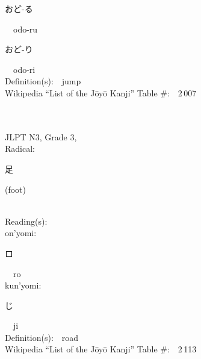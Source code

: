 \begin{multicols}{2}
{\hspace*{2em}}{\begin{CJK}{UTF8}{min} おど-る \end{CJK}}\ \ odo-ru\ \ \\
{\hspace*{2em}}{\begin{CJK}{UTF8}{min} おど-り \end{CJK}}\ \ odo-ri\ \ \\
Definition(s):\ \ jump \\
Wikipedia ``List of the J\=oy\=o Kanji'' Table \#:\ \ 2\,007 \\
\ \ \\
{\fontsize{34pt}{40pt}  }\ \ \\  %
{JLPT N3, Grade 3, \\Radical:\ \ {\begin{CJK}{UTF8}{min} 足 \end{CJK}} (foot) } \\
Reading(s):\ \ \\
{\hspace*{1em}}on'yomi:\ \ \\
{\hspace*{2em}}{\begin{CJK}{UTF8}{min} ロ \end{CJK}}\ \ ro\ \ \\
{\hspace*{1em}}kun'yomi:\ \ \\
{\hspace*{2em}}{\begin{CJK}{UTF8}{min} じ \end{CJK}}\ \ ji\ \ \\
Definition(s):\ \ road \\
Wikipedia ``List of the J\=oy\=o Kanji'' Table \#:\ \ 2\,113 \\
\ \ \\
\end{multicols}



